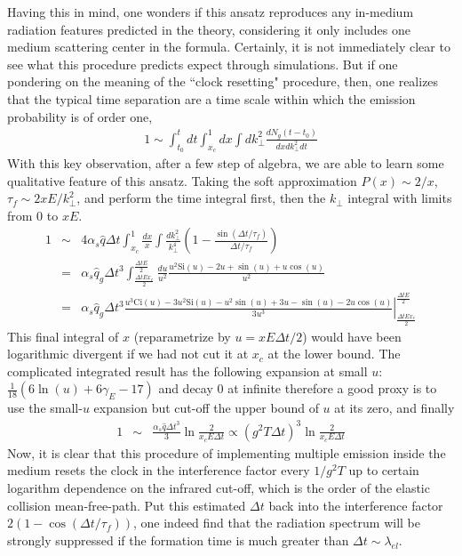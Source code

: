 Having this in mind, one wonders if this ansatz reproduces any in-medium radiation features predicted in the theory, considering it only includes one medium scattering center in the formula.
Certainly, it is not immediately clear to see what this procedure predicts  expect through simulations. 
But if one pondering on the meaning of the ``clock resetting" procedure, then, one realizes that the typical time separation are a time scale within which the emission probability is of order one,
\begin{eqnarray}
1 \sim \int_{t_0}^{t} dt\int_{x_c}^1 dx \int dk_\perp^2 \frac{dN_g(t-t_0)}{dx dk_\perp^2 dt}
\end{eqnarray}
With this key observation, after a few step of algebra, we are able to learn some qualitative feature of this ansatz.
Taking the soft approximation $P(x) \sim 2/x$, $\tau_f\sim 2xE/k_\perp^2$, and perform the time integral first, then the $k_\perp$ integral with limits from $0$ to $xE$.
\begin{eqnarray}
1 &\sim& 4\alpha_s\hat{q}\Delta t \int_{x_c}^1 \frac{dx}{x} \int \frac{dk_\perp^2}{k_\perp^4}\left(1-\frac{\sin(\Delta t/\tau_f)}{\Delta t/\tau_f}\right)\\
&=& \alpha_s\hat{q}_g \Delta t^3 \int_{\frac{\Delta t E x_c}{2}}^{\frac{\Delta t E}{2}} 
\frac{du}{u^2} \frac{u^2 \mathrm{Si}(u) -2u + \sin(u) + u\cos(u)}{u^2}\\
&=& \alpha_s\hat{q}_g \Delta t^3 \left.\frac{u^3\mathrm{Ci}(u)-3u^2\mathrm{Si}(u) - u^2 \sin(u) +3u-\sin(u) - 2u\cos(u)}{3u^3}\right|_{\frac{\Delta t E x_c}{2}}^{\frac{\Delta t E}{2}} 
\end{eqnarray}
This final integral of $x$ (reparametrize by $u = xE\Delta t/2$) would have been logarithmic divergent if we had not cut it at $x_c$ at the lower bound.
The complicated integrated result has the following expansion at small $u$: $\frac{1}{18}(6\ln(u)+6\gamma_E - 17)$ and decay $0$ at infinite therefore a good proxy is to use the small-$u$ expansion but cut-off the upper bound of $u$ at its zero, and finally
\begin{eqnarray}
1 &\sim&  \frac{\alpha_s\hat{q}\Delta t^3}{3}\ln\frac{2}{ x_c E \Delta t } \propto (g^2 T \Delta t)^3 \ln\frac{2}{ x_c E \Delta t }
\end{eqnarray}
Now, it is clear that this procedure of implementing multiple emission inside the medium resets the clock in the interference factor every $1/g^2T$ up to certain logarithm dependence on the infrared cut-off, which is the order of the elastic collision mean-free-path.
Put this estimated $\Delta t$ back into the interference factor $2(1-\cos(\Delta t/\tau_f))$, one indeed find that the radiation spectrum will be strongly suppressed if the formation time is much greater than $\Delta t\sim \lambda_{el}$.

